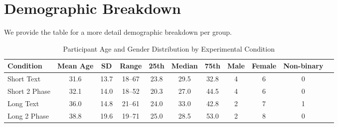 \section{Demographic Breakdown}
\label{sec:apdx:demo}
We provide the table for a more detail demographic breakdown per group.
\begin{table}[h!]
\centering
\caption{Participant Age and Gender Distribution by Experimental Condition}
\label{tab:age_gender_distribution}
\begin{tabular}{lcccccccccc}
\hline
\textbf{Condition} & \textbf{Mean Age} & \textbf{SD} & \textbf{Range} & \textbf{25th} & \textbf{Median} & \textbf{75th} & \textbf{Male} & \textbf{Female} & \textbf{Non-binary} \\
\hline
Short Text      & 31.6  & 13.7 & 18--67 & 23.8 & 29.5 & 32.8 & 4 & 6 & 0 \\
Short 2 Phase   & 32.1  & 14.0 & 18--52 & 20.3 & 27.0 & 44.5 & 4 & 6 & 0 \\
Long Text       & 36.0  & 14.8 & 21--61 & 24.0 & 33.0 & 42.8 & 2 & 7 & 1 \\
Long 2 Phase    & 38.8  & 19.6 & 19--71 & 25.0 & 28.5 & 53.0 & 2 & 8 & 0 \\
\hline
\end{tabular}
\end{table}
